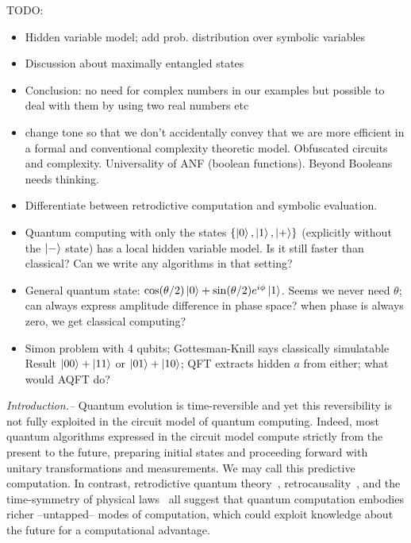 \documentclass[aps,prl,twocolumn,superscriptaddress,floatfix,notitlepage]{revtex4-2}
\begin{document}
TODO:
\begin{itemize}
\item Hidden variable model; add prob. distribution over symbolic variables
    \item Discussion about maximally entangled states
    \item Conclusion: no need for complex numbers in our examples but possible to deal with them by using two real numbers etc
    \item change tone so that we don't accidentally convey that we are more efficient in a formal and conventional complexity theoretic model. Obfuscated circuits and complexity. Universality of ANF (boolean functions). Beyond Booleans needs thinking. 
    \item Differentiate between retrodictive computation and symbolic evaluation. 
\item Quantum computing with only the states $\{\ket{0}, \ket{1}, \ket{+}\}$  (explicitly without the $\ket{-}$ state) has a local hidden variable model. Is it still faster than classical? Can we write any algorithms in that setting?
\item General quantum state: $\cos(\theta/2) \ket{0} + \sin(\theta/2) e^{i\phi} \ket{1}$. Seems we never need $\theta$; can always express amplitude difference in phase space? when phase is always zero, we get classical computing?
  \item Simon problem with 4 qubits; Gottesman-Knill says classically
    simulatable Result $\ket{00}+\ket{11}$ or $\ket{01}+\ket{10}$; QFT
    extracts hidden $a$ from either; what would AQFT do?
\end{itemize}

{\it Introduction.--} Quantum evolution is time-reversible and yet this reversibility 
is not fully exploited in the circuit model of quantum
computing. Indeed, most quantum algorithms expressed in the circuit
model compute strictly from the present to the future, preparing
initial states and proceeding forward with unitary transformations and
measurements. We may call this predictive computation. In contrast, retrodictive quantum
theory~\cite{sym13040586}, retrocausality~\cite{Aharonov2008}, and the
time-symmetry of physical laws~\cite{RevModPhys.27.179} all suggest
that quantum computation embodies richer --untapped-- modes of
computation, which could exploit knowledge about the future for a
computational advantage.
\end{document}
